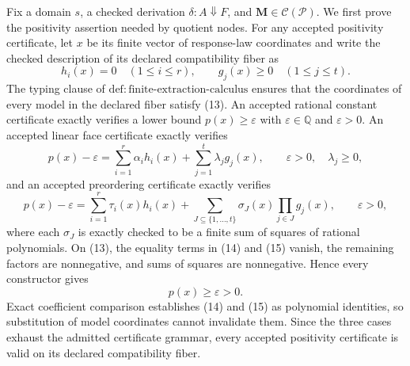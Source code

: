 Fix a domain \(s\), a checked derivation \(\delta:A\Downarrow F\), and \(\mathbf M\in\mathcal C(\mathcal P)\).  We first prove the positivity assertion needed by quotient nodes.  For any accepted positivity certificate, let \(x\) be its finite vector of response-law coordinates and write the checked description of its declared compatibility fiber as
\[
 h_i(x)=0\quad(1\le i\le r),
 \qquad
 g_j(x)\ge0\quad(1\le j\le t).
\tag{13}
\]
The typing clause of \(\mathrm{def:finite\text{-}extraction\text{-}calculus}\) ensures that the coordinates of every model in the declared fiber satisfy (13).  An accepted rational constant certificate exactly verifies a lower bound \(p(x)\ge\varepsilon\) with \(\varepsilon\in\mathbb Q\) and \(\varepsilon>0\).  An accepted linear face certificate exactly verifies
\[
 p(x)-\varepsilon
 =\sum_{i=1}^{r}\alpha_i h_i(x)
  +\sum_{j=1}^{t}\lambda_j g_j(x),
 \qquad \varepsilon>0,\quad\lambda_j\ge0,
\tag{14}
\]
and an accepted preordering certificate exactly verifies
\[
 p(x)-\varepsilon
 =\sum_{i=1}^{r}\tau_i(x)h_i(x)
  +\sum_{J\subseteq\{1,\ldots,t\}}
    \sigma_J(x)\prod_{j\in J}g_j(x),
 \qquad \varepsilon>0,
\tag{15}
\]
where each \(\sigma_J\) is exactly checked to be a finite sum of squares of rational polynomials.  On (13), the equality terms in (14) and (15) vanish, the remaining factors are nonnegative, and sums of squares are nonnegative.  Hence every constructor gives
\[
 p(x)\ge\varepsilon>0.
\tag{16}
\]
Exact coefficient comparison establishes (14) and (15) as polynomial identities, so substitution of model coordinates cannot invalidate them.  Since the three cases exhaust the admitted certificate grammar, every accepted positivity certificate is valid on its declared compatibility fiber.


